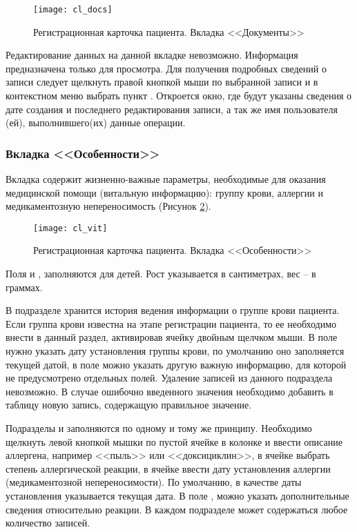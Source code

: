 \begin{figure}[ht]\centering
 \texttt{[image: cl\_docs]}
 \caption{Регистрационная карточка пациента. Вкладка <<Документы>>}
 \label{img_cl_docs}
\end{figure} 

Редактирование данных на данной вкладке невозможно. Информация предназначена только для просмотра. Для получения подробных сведений о записи следует щелкнуть правой кнопкой мыши по выбранной записи и в контекстном меню выбрать пункт . Откроется окно, где будут указаны сведения о дате создания и последнего редактирования записи, а так же имя пользователя (ей), выполнившего(их) данные операции.

\subsubsection{Вкладка <<Особенности>>}

Вкладка  содержит жизненно-важные параметры, необходимые для оказания медицинской помощи (витальную информацию): группу крови, аллергии и медикаментозную непереносимость (Рисунок \ref{img_cl_vit}). 

\begin{figure}[ht]\centering
 \texttt{[image: cl\_vit]}
 \caption{Регистрационная карточка пациента. Вкладка <<Особенности>>}
 \label{img_cl_vit}
\end{figure} 

 Поля  и ,  заполняются для детей. Рост указывается в сантиметрах, вес -- в граммах. 
 
 В подразделе  хранится история ведения информации о группе крови пациента. Если группа крови известна на этапе регистрации пациента, то ее необходимо внести в данный раздел, активировав ячейку  двойным щелчком мыши. В поле  нужно указать дату установления группы крови, по умолчанию оно заполняется текущей датой, в поле  можно указать другую важную информацию, для которой не предусмотрено отдельных полей. Удаление записей из данного подраздела невозможно. В случае ошибочно введенного значения необходимо добавить в таблицу новую запись, содержащую правильное значение.

Подразделы  и  заполняются по одному и тому же принципу. Необходимо щелкнуть левой кнопкой мышки по пустой ячейке в колонке  и ввести описание аллергена, например <<пыль>> или <<доксициклин>>, в ячейке  выбрать степень аллергической реакции, в ячейке  ввести дату установления аллергии (медикаментозной непереносимости). По умолчанию, в качестве даты установления указывается текущая дата. В поле , можно указать дополнительные сведения относительно реакции. В каждом подразделе может содержаться любое количество записей.

